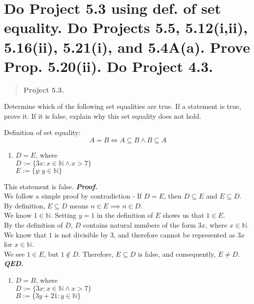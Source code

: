 \section{Do Project 5.3 using def. of set equality. Do Projects 5.5,
5.12(i,ii), 5.16(ii), 5.21(i), and 5.4A(a). Prove Prop. 5.20(ii). Do
Project
4.3.}\label{do-project-5.3-using-def.-of-set-equality.-do-projects-5.5-5.12iii-5.16ii-5.21i-and-5.4aa.-prove-prop.-5.20ii.-do-project-4.3.}

\begin{quote}
\textbf{Project 5.3.}
\end{quote}

Determine which of the following set equalities are true. If a statement
is true, prove it. If it is false, explain why this set equality does
not hold.

Definition of set equality: \[A=B \iff A\subseteq B \land B\subseteq A\]

\begin{enumerate}
\def\labelenumi{(\roman{enumi})}
\tightlist
\item
  \(D = E\), where\\
  \(D := \{3x : x \in \mathbb{N} \land x > 7\}\)\\
  \(E := \{y : y \in \mathbb{N}\}\)
\end{enumerate}

This statement is false. \textbf{\emph{Proof.}}\\
We follow a simple proof by contradiction - If \(D=E\), then
\(D\subseteq E\) and \(E \subseteq D\).\\
By definition, \(E \subseteq D\) means \(n\in E\implies n\in D\).\\
We know \(1\in\mathbb{N}\). Setting \(y=1\) in the definition of \(E\)
shows us that \(1\in E\).\\
By the definition of \(D\), \(D\) contains natural numbers of the form
\(3x\), where \(x\in\mathbb{N}\).\\
We know that \(1\) is not divisible by 3, and therefore cannot be
represented as \(3x\) for \(x\in\mathbb{N}\).\\
We see \(1\in E\), but \(1\notin D\). Therefore, \(E\subseteq D\) is
false, and consequently, \(E\neq D\).\\
\textbf{\emph{QED}.}

\begin{enumerate}
\def\labelenumi{(\roman{enumi})}
\setcounter{enumi}{2}
\tightlist
\item
  \(D = B\), where\\
  \(D := \{3x : x \in \mathbb{N} \land x > 7\}\)\\
  \(B := \{3y + 21 : y \in \mathbb{N}\}\)
\end{enumerate}

